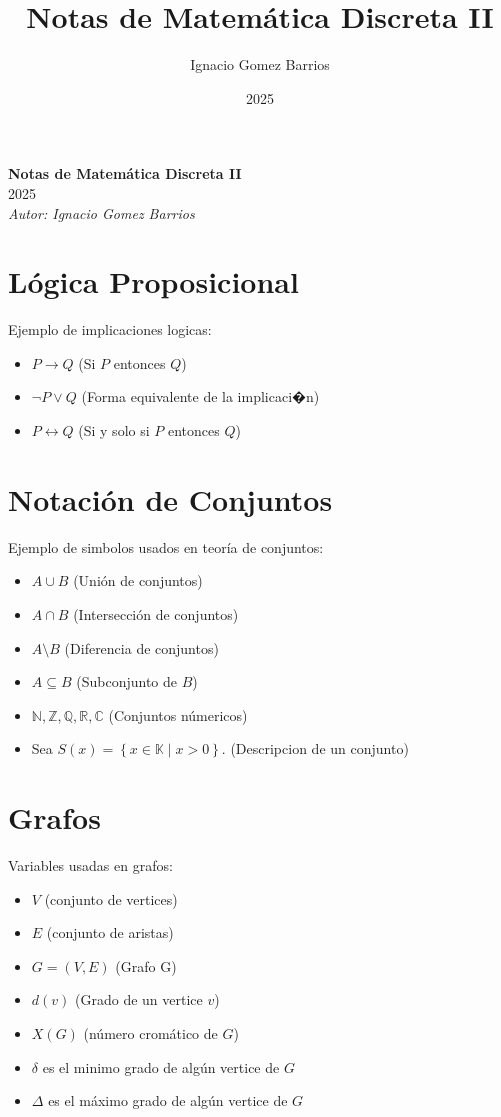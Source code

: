\documentclass{article}
\title{Notas de Matemática Discreta II}
\date{2025}
\author{Ignacio Gomez Barrios}
\begin{document}
\newpage

\begin{center}
  \Huge \textbf{Notas de Matemática Discreta II} \\[3cm]
  \Large 2025 \\[4cm]
  \Large \textit{Autor: Ignacio Gomez Barrios}
\end{center}

\newpage

\section{Lógica Proposicional}
Ejemplo de implicaciones logicas:
\begin{itemize}
  \item $P \rightarrow Q$ (Si $P$ entonces $Q$)
  \item $\neg P \lor Q$ (Forma equivalente de la implicaci�n)
  \item $P \leftrightarrow Q$ (Si y solo si $P$ entonces $Q$)
\end{itemize}

\section{Notación de Conjuntos}
Ejemplo de simbolos usados en teoría de conjuntos:
\begin{itemize}
  \item $A \cup B$ (Unión de conjuntos)
  \item $A \cap B$ (Intersección de conjuntos)
  \item $A \setminus B$ (Diferencia de conjuntos)
  \item $A \subseteq B$ (Subconjunto de $B$)
  \item $\mathbb{N} , \mathbb{Z},  \mathbb{Q}, \mathbb{R},  \mathbb{C}$ (Conjuntos númericos)
   \item  Sea \( S(x) = \left\{ x \in \mathbb{K} \mid x > 0 \right\} \). (Descripcion de un conjunto)
\end{itemize}

\section{Grafos}
Variables usadas en grafos:
\begin{itemize}
  \item $V$ (conjunto de vertices)
  \item $E$ (conjunto de aristas)
  \item $G = (V, E)$ (Grafo G)
  \item $d(v)$ (Grado de un vertice $v$)
  \item \( X(G) \) (número cromático de \( G \))
  \item \( \delta \) es el minimo grado de algún vertice de \(G \)
  \item \( \Delta \) es el máximo grado de algún vertice de \(G \)
\end{itemize}
\end{document}
